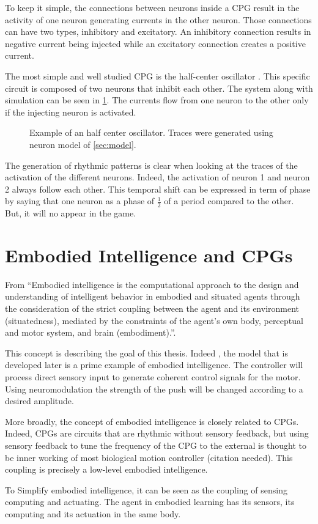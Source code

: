 To keep it simple, the connections between neurons inside a CPG result in the activity of one neuron generating currents in the other neuron. 
Those connections can have two types, inhibitory and excitatory. 
An inhibitory connection results in negative current being injected while an excitatory connection creates a positive current.

The most simple and well studied CPG is the half-center oscillator \citep{halfcenter}. 
This specific circuit is composed of two neurons that inhibit each other. 
The system along with simulation can be seen in \ref{fig:halfcenter}.
The currents flow from one neuron to the other only if the injecting neuron is activated.

\begin{figure}[htb]
    \centering
    \caption{Example of an half center oscillator. Traces were generated using neuron model of \cref{sec:model}.}
    \label{fig:halfcenter}
\end{figure}

The generation of rhythmic patterns is clear when looking at the traces of the activation of the different neurons. 
Indeed, the activation of neuron 1 and neuron 2 always follow each other.
This temporal shift can be expressed in term of phase by saying that one neuron as a phase of $\frac{1}{2}$ of a period compared to the other.
But, it will no appear in the game.

\section{Embodied Intelligence and CPGs} 

From \citet{embodiedDef} \enquote{Embodied intelligence is the computational approach to the design and understanding of intelligent behavior in embodied and situated agents through the consideration of the strict coupling between the agent and its environment (situatedness), mediated by the constraints of the agent’s own body, perceptual and motor system, and brain (embodiment).}.

This concept is describing the goal of this thesis.
Indeed , the model that is developed later is a prime example of embodied intelligence. 
The controller will process direct sensory input to generate coherent control signals for the motor. Using neuromodulation the strength of the push will be changed according to a desired amplitude.

More broadly, the concept of embodied intelligence is closely related to CPGs. Indeed, CPGs are circuits that are rhythmic without sensory feedback, but using sensory feedback to tune the frequency of the CPG to the external is thought to be inner working of most biological motion controller (citation needed).
This coupling is precisely a low-level embodied intelligence. 

To Simplify embodied intelligence, it can be seen as the coupling of sensing computing and actuating. 
The agent in embodied learning has its sensors, its computing and its actuation in the same body. 


